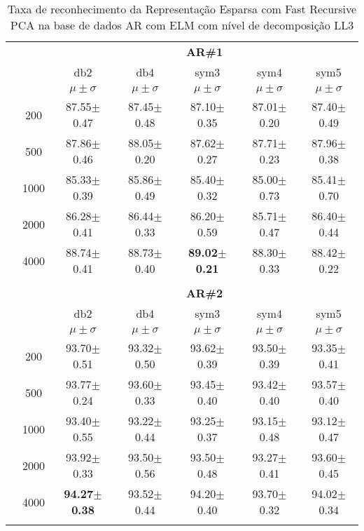 \begin{table}[H]
	\centering
    \normalsize
	\caption{Taxa de reconhecimento da Representação Esparsa com Fast Recursive PCA na base de dados AR com ELM com nível de decomposição LL3}
		\begin{tabular}{|c|c|c c c c c|}
\cline{3-7}
\multicolumn{2}{c|}{\multirow{3}{*}{}} & \multicolumn{5}{c|}{\textbf{AR\#1}}   \\\cline{3-7} 
\multicolumn{2}{c|}{}  & db2 & db4 & sym3 & sym4 & sym5 \\\cline{3-7}%
\multicolumn{2}{c|}{}& $\mu \pm \sigma$ & $\mu \pm \sigma$ & $\mu \pm \sigma$ & $\mu \pm \sigma$ & $\mu \pm \sigma$ \\\hline


\multicolumn{1}{|c|}{ \multirow{5}{*}{\rotatebox[origin=c]{90}{\textbf{Neurônios}}} }
&200	&87.55$\pm$0.47 	&87.45$\pm$0.48	&87.10$\pm$0.35	&87.01$\pm$0.20	&87.40$\pm$0.49 \\\cline{2-7}
&500	&87.86$\pm$0.46 	&88.05$\pm$0.20	&87.62$\pm$0.27	&87.71$\pm$0.23	&87.96$\pm$0.38 \\\cline{2-7}
&1000	&85.33$\pm$0.39 	&85.86$\pm$0.49	&85.40$\pm$0.32	&85.00$\pm$0.73	&85.41$\pm$0.70 \\\cline{2-7}
&2000	&86.28$\pm$0.41     &86.44$\pm$0.33	&86.20$\pm$0.59	&85.71$\pm$0.47	&86.40$\pm$0.44 \\\cline{2-7}
&4000	&88.74$\pm$0.41 	&88.73$\pm$0.40	&\textbf{89.02$\pm$0.21}	&88.30$\pm$0.33	&88.42$\pm$0.22\\ \midrule
\multicolumn{7}{c}{}\\ 


\cline{3-7}
\multicolumn{2}{c|}{\multirow{3}{*}{}} & \multicolumn{5}{c|}{\textbf{AR\#2}}   \\\cline{3-7} 
\multicolumn{2}{c|}{}  & db2 & db4 & sym3 & sym4 & sym5 \\\cline{3-7}%
\multicolumn{2}{c|}{}& $\mu \pm \sigma$ & $\mu \pm \sigma$ & $\mu \pm \sigma$ & $\mu \pm \sigma$ & $\mu \pm \sigma$ \\\hline

\multicolumn{1}{|c|}{ \multirow{5}{*}{\rotatebox[origin=c]{90}{\textbf{Neurônios}}} }
&200	&93.70$\pm$0.51	&93.32$\pm$0.50	&93.62$\pm$0.39	&93.50$\pm$0.39	&93.35$\pm$0.41 \\\cline{2-7}
&500	&93.77$\pm$0.24	&93.60$\pm$0.33	&93.45$\pm$0.40	&93.42$\pm$0.40	&93.57$\pm$0.40 \\\cline{2-7}
&1000	&93.40$\pm$0.55	&93.22$\pm$0.44	&93.25$\pm$0.37	&93.15$\pm$0.48	&93.12$\pm$0.47 \\\cline{2-7}
&2000	&93.92$\pm$0.33	&93.50$\pm$0.56	&93.50$\pm$0.48	&93.27$\pm$0.41 &93.60$\pm$0.45 \\\cline{2-7}
&4000	&\textbf{94.27$\pm$0.38}	&93.52$\pm$0.44	&94.20$\pm$0.40	&93.70$\pm$0.32	&94.02$\pm$0.34 \\ \midrule
\multicolumn{7}{c}{}\\ 



\end{tabular}
\end{table}

